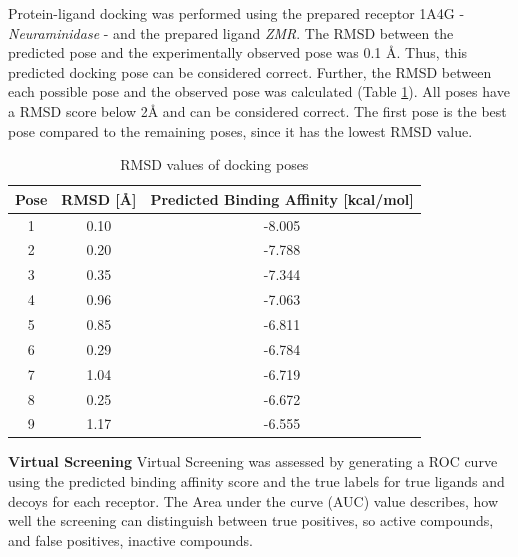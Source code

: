 \documentclass[a4paper,10pt]{article}
\begin{document}
Protein-ligand docking was performed using the prepared receptor 1A4G - \textit{Neuraminidase} - and the prepared ligand \textit{ZMR}. The RMSD between the predicted pose and the experimentally observed pose was 0.1 Å. Thus, this predicted docking pose can be considered correct. Further, the RMSD between each possible pose and the observed pose was calculated (Table \ref{tab:rmsd}). All poses have a RMSD score below 2Å and can be considered correct. The first pose is the best pose compared to the remaining poses, since it has the lowest RMSD value.


\begin{table}[h!]
\centering
\caption{RMSD values of docking poses}
\label{tab:rmsd}
\begin{tabular}{|c|c|c|}
\hline
\textbf{Pose} & \textbf{RMSD [\AA]} & \textbf{Predicted Binding Affinity [kcal/mol]} \\
\hline
1 & 0.10 & -8.005\\
2 & 0.20 & -7.788\\
3 & 0.35 & -7.344\\
4 & 0.96 & -7.063\\
5 & 0.85 & -6.811\\
6 & 0.29 & -6.784 \\
7 & 1.04 & -6.719 \\
8 & 0.25 & -6.672\\
9 & 1.17 & -6.555 \\
\hline
\end{tabular}
\end{table}


\textbf{Virtual Screening}
Virtual Screening was assessed by generating a ROC curve using the predicted binding affinity score and the true labels for true ligands and decoys for each receptor. The Area under the curve (AUC) value describes, how well the screening can distinguish between true positives, so active compounds, and false positives, inactive compounds. 
\end{document}
